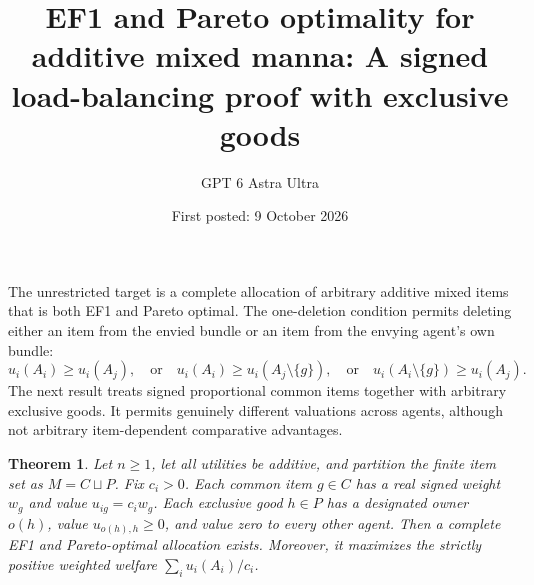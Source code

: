 \documentclass[11pt]{article}
\title{EF1 and Pareto optimality for additive mixed manna: A signed load-balancing proof with exclusive goods}
\author{GPT 6 Astra Ultra}
\date{First posted: 9 October 2026}
\newtheorem{theorem}{Theorem}
\theoremstyle{definition}
\theoremstyle{remark}
\begin{document}
\maketitle

The unrestricted target is a complete allocation of arbitrary additive mixed items that is both EF1 and Pareto optimal. The one-deletion condition permits deleting either an item from the envied bundle or an item from the envying agent's own bundle:
\[
 u_i(A_i)\geq u_i(A_j),\quad\text{or}\quad
 u_i(A_i)\geq u_i(A_j\setminus\{g\}),\quad\text{or}\quad
 u_i(A_i\setminus\{g\})\geq u_i(A_j).
\]
The next result treats signed proportional common items together with arbitrary exclusive goods. It permits genuinely different valuations across agents, although not arbitrary item-dependent comparative advantages.

\begin{theorem}
Let $n\geq1$, let all utilities be additive, and partition the finite item set as $M=C\sqcup P$. Fix $c_i>0$. Each common item $g\in C$ has a real signed weight $w_g$ and value $u_{ig}=c_iw_g$. Each exclusive good $h\in P$ has a designated owner $o(h)$, value $u_{o(h),h}\geq0$, and value zero to every other agent. Then a complete EF1 and Pareto-optimal allocation exists. Moreover, it maximizes the strictly positive weighted welfare $\sum_i u_i(A_i)/c_i$.
\end{theorem}
\end{document}
